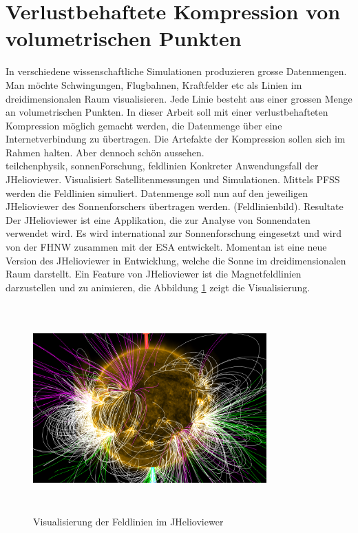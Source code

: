 \section{Verlustbehaftete Kompression von volumetrischen Punkten}
In verschiedene wissenschaftliche Simulationen produzieren grosse Datenmengen. Man möchte Schwingungen, Flugbahnen, Kraftfelder etc als Linien im dreidimensionalen Raum visualisieren. Jede Linie besteht aus einer grossen Menge an volumetrischen Punkten.
In dieser Arbeit soll mit einer verlustbehafteten Kompression möglich gemacht werden, die Datenmenge über eine Internetverbindung zu übertragen. Die Artefakte der Kompression sollen sich im Rahmen halten. Aber dennoch schön aussehen.\\
[\baselineskip]
teilchenphysik, sonnenForschung, feldlinien Konkreter Anwendungsfall der JHelioviewer. Visualisiert Satellitenmessungen und Simulationen. Mittels PFSS werden die Feldlinien simuliert. Datenmenge soll nun auf den jeweiligen JHelioviewer des Sonnenforschers übertragen werden. (Feldlinienbild). Resultate\\
[\baselineskip]
Der JHelioviewer ist eine Applikation, die zur Analyse von Sonnendaten verwendet wird. Es wird international zur Sonnenforschung eingesetzt und wird von der FHNW zusammen mit der ESA entwickelt. Momentan ist eine neue Version des JHelioviewer in Entwicklung, welche die Sonne im dreidimensionalen Raum darstellt. Ein Feature von JHelioviewer ist die Magnetfeldlinien darzustellen und zu animieren, die Abbildung \ref{einleitung::feldlinien} zeigt die Visualisierung.
\begin{figure}[!htbp]
\center
	\includegraphics[width=0.8\textwidth,height=8cm,keepaspectratio]{./pictures/einleitung/fieldLines.png}
	\caption{Visualisierung der Feldlinien im JHelioviewer}
	\label{einleitung::feldlinien}
\end{figure}
